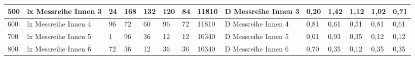 \begin{table}[]
{\begin{tabular}{|l|l|l|l|l|l|l|l|l|l|l|l|l|l|}
  \rowcolor[HTML]{C6E0B4} 
  500                                             & lx   Messreihe Innen 3                                    & 24                                & 168                               & 132                               & 120                               & 84                                & \cellcolor[HTML]{A9D08E}11810                                 & D   Messreihe Innen 3                                      & 0,20                                      & 1,42                                       & 1,12                                       & 1,02                                       & 0,71                                       \\ \hline
  \rowcolor[HTML]{E2EFDA} 
  600                                             & lx   Messreihe Innen 4                                    & 96                                & 72                                & 60                                & 96                                & 72                                & \cellcolor[HTML]{A9D08E}11810                                 & D   Messreihe Innen 4                                      & 0,81                                      & 0,61                                       & 0,51                                       & 0,81                                       & 0,61                                       \\ \hline
  \rowcolor[HTML]{C6E0B4} 
  700                                             & lx  Messreihe Innen 5                                     & 1                                 & 96                                & 36                                & 12                                & 12                                & \cellcolor[HTML]{A9D08E}10340                                 & D  Messreihe Innen 5                                       & 0,01                                      & 0,93                                       & 0,35                                       & 0,12                                       & 0,12                                       \\ \hline
  \rowcolor[HTML]{E2EFDA} 
  800                                             & lx   Messreihe Innen 6                                    & 72                                & 36                                & 12                                & 36                                & 36                                & \cellcolor[HTML]{A9D08E}10340                                 & D   Messreihe Innen 6                                      & 0,70                                      & 0,35                                       & 0,12                                       & 0,35                                       & 0,35                                       \\ \hline
  \end{tabular}%
  }
  \end{table}
